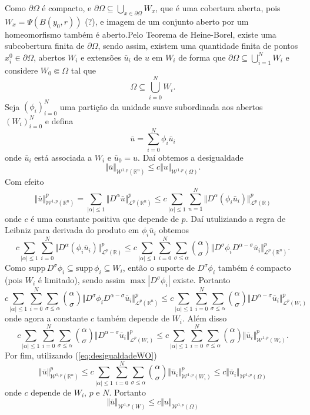\documentclass[a4paper, 11pt]{book}
\theoremstyle{definition}
\newcommand{\bR}{\mathbb{R}}
\newcommand{\cL}{\mathcal{L}}
\newcommand{\cW}{\mathcal{W}}
\newcommand{\supp}{\mathrm{supp}\,}
\begin{document}
\begin{prf}
    Como $\partial\Omega$ é compacto, e $\partial \Omega \subseteq \bigcup_{x \in \partial\Omega} W_x$,
    que é uma cobertura aberta, pois $W_x = \Psi(B(y_0, r))$ (?), e imagem de um conjunto aberto por um homeomorfismo também é aberto.Pelo Teorema de Heine-Borel, existe uma subcobertura finita de $\partial\Omega$,
    sendo assim, existem uma quantidade finita de pontos $x^0_i \in \partial\Omega$, abertos $W_i$ e extensões $\bar u_i$ de $u$ em $W_i$ de forma que $\partial\Omega \subseteq \bigcup_{i=1}^N W_i$
    e considere $W_0 \Subset \Omega$ tal que
    \[
        \Omega \subseteq \bigcup_{i=0}^N W_i.
    \]
    Seja $(\phi_i)_{i=0}^N$ uma partição da unidade suave subordinada aos abertos $(W_i)_{i=0}^N$ e defina
    \[
        \bar u = \sum_{i=0}^N \phi_i \bar u_i
    \]
    onde $\bar u_i$ está associada a $W_i$ e $\bar u_0 = u$. Daí obtemos a desigualdade
    \[
        \Vert \bar u \Vert_{\cW^{1,p}(\bR^n)} \leqslant c \Vert u \Vert_{\cW^{1,p}(\Omega)}.
    \]
    Com efeito
    \[
        \Vert \bar u \Vert^p_{\cW^{1,p}(\bR^n)} = \sum_{|\alpha| \leqslant 1} \Vert D^\alpha \bar u \Vert^p_{\cL^p(\bR^n)}
        \leqslant c\sum_{|\alpha| \leqslant 1} \sum_{n=1}^N \Vert D^\alpha (\phi_i \bar u_i) \Vert_{\cL^p(\bR)}^p
    \]
    onde $c$ é uma constante positiva que depende de $p$. Daí utuliziando a regra de Leibniz para derivada do produto em $\phi_i \bar u_i$ obtemos
    \[
        c\sum_{|\alpha| \leqslant 1} \sum_{i=0}^N \Vert D^\alpha (\phi_i \bar u_i) \Vert_{\cL^p(\bR)}^p \leqslant c\sum_{|\alpha| \leqslant 1} \sum_{i=0}^{N} \sum_{\sigma \leqslant \alpha} \binom{\alpha}{\sigma} \Vert D^\sigma \phi_i D^{\alpha - \sigma} \bar u_i \Vert_{\cL^p(\bR^n)}^p.
    \]
    Como $\supp D^\sigma \phi_i \subseteq \supp \phi_i \subseteq W_i$, então o suporte de $D^\sigma \phi_i$ também é compacto (pois $W_i$ é limitado), sendo assim $\max |D^\sigma \phi_i|$ existe.
    Portanto
    \[
        c\sum_{|\alpha| \leqslant 1} \sum_{i=0}^{N} \sum_{\sigma \leqslant \alpha} \binom{\alpha}{\sigma} \Vert D^\sigma \phi_i D^{\alpha - \sigma} \bar u_i \Vert_{\cL^p(\bR^n)}^p \leqslant c\sum_{|\alpha| \leqslant 1} \sum_{i=0}^{N} \sum_{\sigma \leqslant \alpha} \binom{\alpha}{\sigma} \Vert D^{\alpha - \sigma} \bar u_i \Vert_{\cL^p(W_i)}^p
    \]
    onde agora a constante $c$ também depende de $W_i$. Além disso
    \[
        c\sum_{|\alpha| \leqslant 1} \sum_{i=0}^{N} \sum_{\sigma \leqslant \alpha} \binom{\alpha}{\sigma} \Vert D^{\alpha - \sigma} \bar u_i \Vert_{\cL^p(W_i)}^p \leqslant c\sum_{|\alpha| \leqslant 1} \sum_{i=0}^{N} \sum_{\sigma \leqslant \alpha} \binom{\alpha}{\sigma} \Vert \bar u_i \Vert_{\cW^{1,p}(W_i)}^p.
    \]
    Por fim, utilizando (\ref{eq:desigualdadeWO})
    \[
         \Vert \bar u \Vert^p_{\cW^{1,p}(\bR^n)} \leqslant c\sum_{|\alpha| \leqslant 1} \sum_{i=0}^{N} \sum_{\sigma \leqslant \alpha} \binom{\alpha}{\sigma} \Vert \bar u_i \Vert_{\cW^{1,p}(W_i)}^p \leqslant c\Vert \bar u_i \Vert_{\cW^{1,p}(\Omega)}
    \]
    onde $c$ depende de $W_i$, $p$ e $N$.
    Portanto
    \[
        \Vert \bar u \Vert_{\cW^{1,p}(W)} \leqslant c \Vert u \Vert_{\cW^{1,p}(\Omega)}
    \]


\end{prf}
\end{document}

